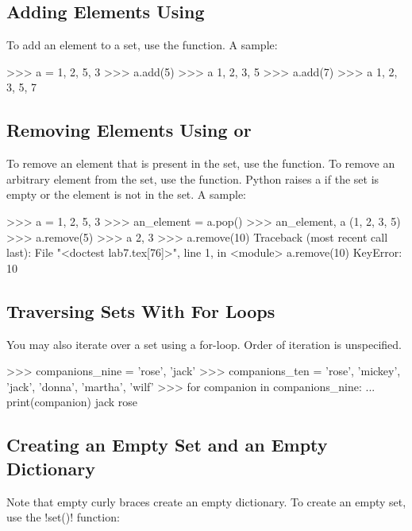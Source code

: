 \documentclass[11pt]{cselabheader}
\begin{document}
\subsection{Adding Elements Using }
To add an element to a set, use the  function.
A sample:

\begin{pyconcode}
>>> a = {1, 2, 5, 3}
>>> a.add(5)
>>> a
{1, 2, 3, 5}
>>> a.add(7)
>>> a
{1, 2, 3, 5, 7}

\end{pyconcode}

\subsection{Removing Elements Using  or }
To remove an element that is present in the set, use the 
function. To remove an arbitrary element from the set, use the  function.
Python raises a  if the set is empty or the element is not in the set.
A sample:

\begin{pyconcode}
>>> a = {1, 2, 5, 3}
>>> an_element = a.pop()
>>> an_element, a
(1, {2, 3, 5})
>>> a.remove(5)
>>> a
{2, 3}
>>> a.remove(10)
Traceback (most recent call last):
  File "<doctest lab7.tex[76]>", line 1, in <module>
    a.remove(10)
KeyError: 10

\end{pyconcode}

\subsection{Traversing Sets With For Loops}

You may also iterate over a set using a for-loop.
Order of iteration is unspecified.

\begin{pyconcode}
>>> companions_nine = {'rose', 'jack'}
>>> companions_ten = {'rose', 'mickey', 'jack', 'donna', 'martha', 'wilf'}
>>> for companion in companions_nine:
...     print(companion)
jack
rose

\end{pyconcode}



\subsection{Creating an Empty Set and an Empty Dictionary}
Note that empty curly braces create an empty dictionary. To create an empty set, use the
\pythoninline!set()! function:
\end{document}
